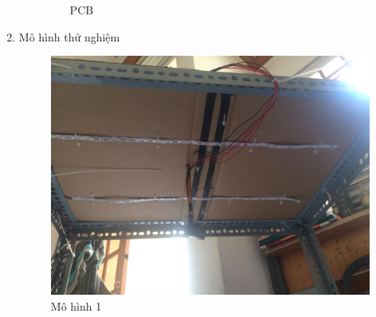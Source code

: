 \documentclass[a4paper,12pt,oneside]{article}
\begin{document}
\begin{enumerate}
\begin{itemize}
\begin{figure}[H]
\begin{center}
			\end{center}
			\caption{PCB}
			\end{figure}
	\end{itemize}
	\item Mô hình thử nghiệm
			\begin{figure}[H]
			\centering
			\begin{center}
			\includegraphics[scale=.1]{hinh/mohinh_1.jpg}
			\end{center}
			\caption{Mô hình 1}
			\end{figure}
			

\end{enumerate}
\end{document}
